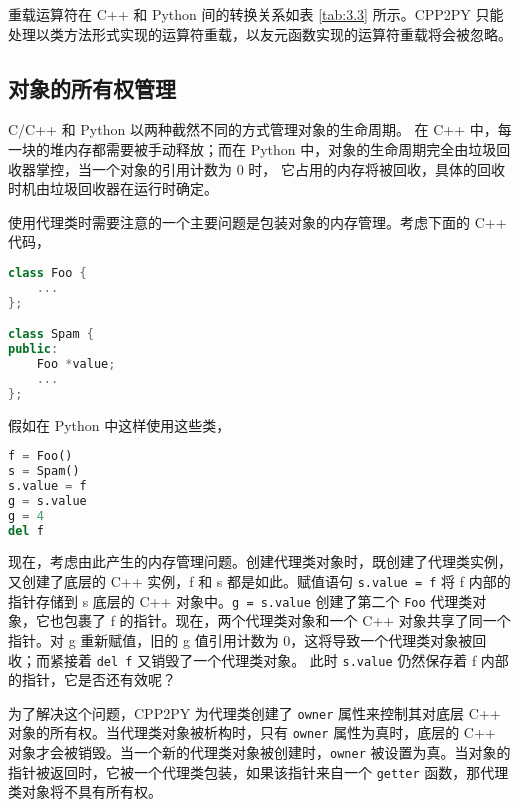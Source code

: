 重载运算符在 C++ 和 Python 间的转换关系如表 \ref{tab:3.3} 所示。CPP2PY 只能处理以类方法形式实现的运算符重载，以友元函数实现的运算符重载将会被忽略。



\subsection{对象的所有权管理}

C/C++ 和 Python 以两种截然不同的方式管理对象的生命周期。 在 C++ 中，每一块的堆内存都需要被手动释放；而在 Python 中，对象的生命周期完全由垃圾回收器掌控，当一个对象的引用计数为 0 时， 它占用的内存将被回收，具体的回收时机由垃圾回收器在运行时确定。

使用代理类时需要注意的一个主要问题是包装对象的内存管理。考虑下面的 C++ 代码，

\begin{framed}
\begin{lstlisting}[language=c++]
class Foo {
	...
};

class Spam {
public:
    Foo *value;
    ...
};
\end{lstlisting}
\end{framed}

假如在 Python 中这样使用这些类，

\begin{framed}
\begin{lstlisting}[language=python]
f = Foo()
s = Spam() 
s.value = f
g = s.value
g = 4
del f
\end{lstlisting}
\end{framed}

现在，考虑由此产生的内存管理问题。创建代理类对象时，既创建了代理类实例，又创建了底层的 C++ 实例，f 和 s 都是如此。赋值语句 \lstinline{s.value = f} 将 f 内部的指针存储到 s 底层的 C++ 对象中。\lstinline{g = s.value} 创建了第二个 \lstinline{Foo} 代理类对象，它也包裹了 f 的指针。现在，两个代理类对象和一个 C++ 对象共享了同一个指针。对 g 重新赋值，旧的 g 值引用计数为 0，这将导致一个代理类对象被回收；而紧接着 \lstinline{del f} 又销毁了一个代理类对象。 此时 \lstinline{s.value} 仍然保存着 f 内部的指针，它是否还有效呢？

为了解决这个问题，CPP2PY 为代理类创建了 \lstinline{owner} 属性来控制其对底层 C++ 对象的所有权。当代理类对象被析构时，只有 \lstinline{owner} 属性为真时，底层的 C++ 对象才会被销毁。当一个新的代理类对象被创建时，\lstinline{owner} 被设置为真。当对象的指针被返回时，它被一个代理类包装，如果该指针来自一个 \lstinline{getter} 函数，那代理类对象将不具有所有权。

